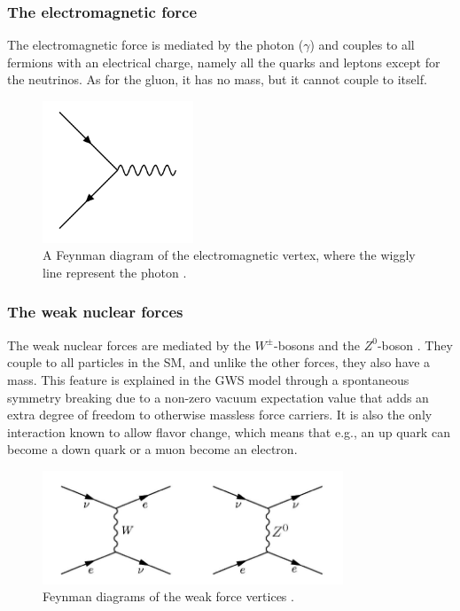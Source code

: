 \subsubsection{The electromagnetic force}
The electromagnetic force is mediated by the photon ($\gamma$) \cite{thomson} and couples to all fermions with an electrical charge, namely all the quarks and leptons except for the neutrinos. As for the gluon, it has no mass, but it cannot couple to itself. 

\begin{figure}[H]
    \centering
    \includegraphics[width = 0.4\textwidth]{Figures/FeynmanDiagrams/photon.png}
    \caption{A Feynman diagram of the electromagnetic vertex, where the wiggly line represent the photon \cite{EMforce}.}
    \label{fig:my_label}
\end{figure}

\subsubsection{The weak nuclear forces}
The weak nuclear forces are mediated by the $W^\pm$-bosons and the $Z^0$-boson \cite{thomson}. They couple to all particles in the SM, and unlike the other forces, they also have a mass. This feature is explained in the GWS model \cite{Xin2007GlashowWeinbergSalamMA} through a spontaneous symmetry breaking due to a non-zero vacuum expectation value that adds an extra degree of freedom to otherwise massless force carriers. It is also the only interaction known to allow flavor change, which means that e.g., an up quark can become a down quark or a muon become an electron. 

\begin{figure}[H]
    \centering
    \includegraphics[width = 0.8\textwidth]{Figures/FeynmanDiagrams/weak.png}
    \caption{Feynman diagrams of the weak force vertices \cite{WEAKforce}.}
    \label{fig:my_label}
\end{figure}


